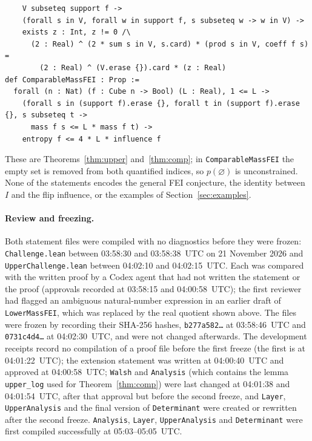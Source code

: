 \documentclass[11pt]{article}
\theoremstyle{definition}
\theoremstyle{remark}
\begin{document}
{{\begin{verbatim}
    V subseteq support f ->
    (forall s in V, forall w in support f, s subseteq w -> w in V) ->
    exists z : Int, z != 0 /\
      (2 : Real) ^ (2 * sum s in V, s.card) * (prod s in V, coeff f s) =
        (2 : Real) ^ (V.erase {}).card * (z : Real)
def ComparableMassFEI : Prop :=
  forall (n : Nat) (f : Cube n -> Bool) (L : Real), 1 <= L ->
    (forall s in (support f).erase {}, forall t in (support f).erase {}, s subseteq t ->
      mass f s <= L * mass f t) ->
    entropy f <= 4 * L * influence f
\end{verbatim}}
\noindent These are Theorems~\ref{thm:upper} and~\ref{thm:comp}; in
\texttt{ComparableMassFEI} the empty set is removed from both quantified
indices, so $p(\varnothing)$ is unconstrained. None of the statements encodes
the general FEI conjecture, the identity between $I$ and the flip influence, or
the examples of Section~\ref{sec:examples}.

\paragraph{Review and freezing.} Both statement files were compiled with no
diagnostics before they were frozen: \texttt{Challenge.lean} between 03:58:30
and 03:58:38~UTC on 21 November 2026 and \texttt{UpperChallenge.lean} between
04:02:10 and 04:02:15~UTC. Each was compared with the written proof by a Codex
agent that had not written the statement or the proof (approvals recorded at
03:58:15 and 04:00:58~UTC); the first reviewer had flagged an ambiguous
natural-number expression in an earlier draft of \texttt{LowerMassFEI}, which
was replaced by the real quotient shown above. The files were frozen by
recording their SHA-256 hashes, \texttt{b277a582\ldots} at 03:58:46~UTC and
\texttt{0731c4d4\ldots} at 04:02:30~UTC, and were not changed afterwards. The
development receipts record no compilation of a proof file before the first
freeze (the first is at 04:01:22~UTC); the extension statement was written at
04:00:40~UTC and approved at 04:00:58~UTC; \texttt{Walsh} and
\texttt{Analysis} (which contains the lemma \texttt{upper\_log} used for
Theorem~\ref{thm:comp}) were last changed at 04:01:38 and 04:01:54~UTC, after
that approval but before the second freeze, and \texttt{Layer},
\texttt{UpperAnalysis} and the final version of \texttt{Determinant} were
created or rewritten after the second freeze. \texttt{Analysis},
\texttt{Layer}, \texttt{UpperAnalysis} and \texttt{Determinant} were first
compiled successfully at 05:03--05:05~UTC.

}
\end{document}
